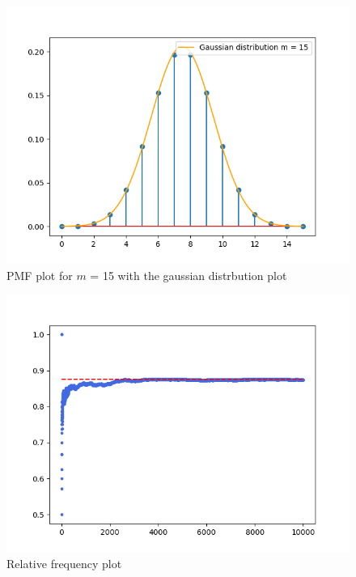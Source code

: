 \documentclass[journal]{IEEEtran}
\begin{document}
\begin{figure}[h!]
  \centering
  \includegraphics[width=0.7\columnwidth]{figs/pmf2.png}
  \caption{PMF plot for $m$ = 15 with the gaussian distrbution plot}
  \label{label}
\end{figure}

\begin{figure}[h!]
  \centering
  \includegraphics[width=0.7\columnwidth]{figs/sim.png}
  \caption{Relative frequency plot}
  \label{label}
\end{figure}
\end{document}
